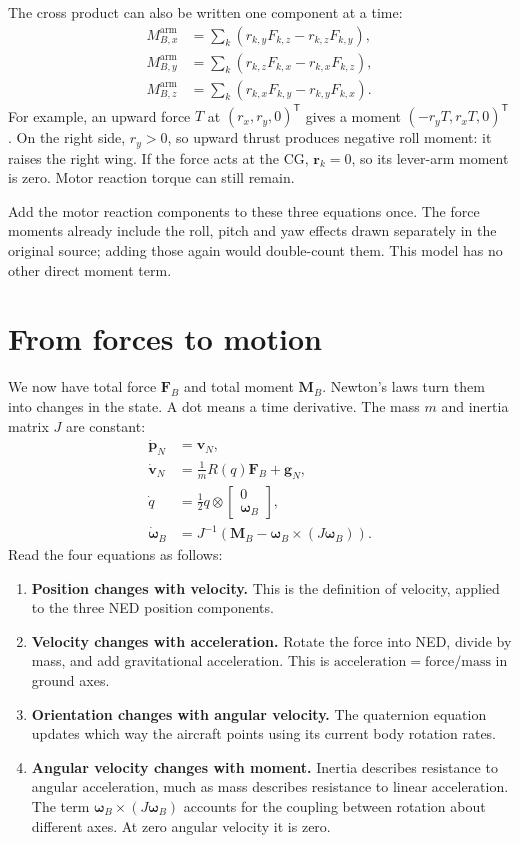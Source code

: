 \documentclass[11pt,a4paper]{article}
\numberwithin{equation}{section}
\newcommand{\vect}[1]{\boldsymbol{#1}}
\newcommand{\trans}{^{\mathsf T}}
\begin{document}
The cross product can also be written one component at a time:
\begin{align}
 M_{B,x}^{\mathrm{arm}}&=\sum_k(r_{k,y}F_{k,z}-r_{k,z}F_{k,y}),\\
 M_{B,y}^{\mathrm{arm}}&=\sum_k(r_{k,z}F_{k,x}-r_{k,x}F_{k,z}),\\
 M_{B,z}^{\mathrm{arm}}&=\sum_k(r_{k,x}F_{k,y}-r_{k,y}F_{k,x}).
\end{align}
For example, an upward force $T$ at $(r_x,r_y,0)\trans$ gives a moment
$(-r_yT,r_xT,0)\trans$. On the right side, $r_y>0$, so upward thrust
produces negative roll moment: it raises the right wing.
If the force acts at the CG, $\vect r_k=0$, so its lever-arm moment is zero.
Motor reaction torque can still remain.

Add the motor reaction components to these three equations once.
The force moments already include the roll, pitch and yaw effects drawn
separately in the original source; adding those again would double-count
them. This model has no other direct moment term.

\section{From forces to motion}
We now have total force $\vect F_B$ and total moment $\vect M_B$.
Newton's laws turn them into changes in the state. A dot means a time
derivative. The mass $m$ and inertia matrix $J$ are constant:
\begin{align}
 \dot{\vect p}_N&=\vect v_N,\label{eq:position-dot}\\
 \dot{\vect v}_N&=\frac{1}{m}R(q)\vect F_B+\vect g_N,\label{eq:velocity-dot}\\
 \dot q&=\tfrac12 q\otimes\begin{bmatrix}0\\\vect\omega_B\end{bmatrix},
 \label{eq:quaternion-dot}\\
 \dot{\vect\omega}_B&=J^{-1}
 \left(\vect M_B-\vect\omega_B\times(J\vect\omega_B)\right).
 \label{eq:angular-dot}
\end{align}
Read the four equations as follows:
\begin{enumerate}
  \item \textbf{Position changes with velocity.} This is the definition of
  velocity, applied to the three NED position components.
  \item \textbf{Velocity changes with acceleration.} Rotate the force into
  NED, divide by mass, and add gravitational acceleration. This is
  $\text{acceleration}=\text{force}/\text{mass}$ in ground axes.
  \item \textbf{Orientation changes with angular velocity.} The quaternion
  equation updates which way the aircraft points using its current body
  rotation rates.
  \item \textbf{Angular velocity changes with moment.} Inertia describes
  resistance to angular acceleration, much as mass describes resistance to
  linear acceleration. The term
  $\vect\omega_B\times(J\vect\omega_B)$ accounts for the coupling between
  rotation about different axes. At zero angular velocity it is zero.
\end{enumerate}
\end{document}
